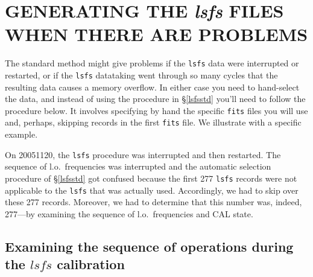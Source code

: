 \documentclass[psfig,preprint]{aastex}
\begin{document}
{\section{GENERATING THE {\it lsfs} FILES WHEN THERE ARE PROBLEMS} \label{lsfsprob}

	The standard method might give problems if the \verb$lsfs$ data
were interrupted or restarted, or if the \verb$lsfs$ datataking went
through so many cycles that the resulting data causes a memory overflow.
In either case you need to hand-select the data, and instead of using
the procedure in \S \ref{lsfsstd} you'll need to follow the procedure
below. It involves specifying by hand the specific \verb$fits$ files you
will use and, perhaps, skipping records in the first \verb$fits$ file.
We illustrate with a specific example.

	On 20051120, the \verb$lsfs$ procedure was interrupted and then
restarted. The sequence of l.o.\ frequencies was interrupted and the
automatic selection procedure of \S \ref{lsfsstd} got confused because
the first 277 \verb$lsfs$ records were not applicable to the
\verb$lsfs$ that was actually used. Accordingly, we had to skip over
these 277 records. Moreover, we had to determine that this number was,
indeed, 277---by examining the sequence of l.o.\ frequencies and CAL
state. 

\subsection{Examining the sequence of operations during the $lsfs$
calibration} \label{lsfsex}

}
\end{document}
